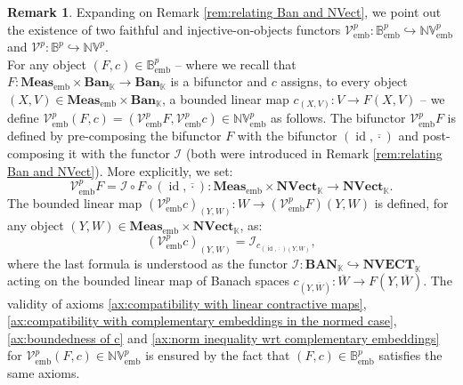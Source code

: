 \documentclass{amsart}
\theoremstyle{definition}
\newtheorem{remark}[definition]{Remark}
\theoremstyle{plain}
\newcommand{\id}{\operatorname{id}}
\newcommand{\embMeas}{\mathbf{Meas}_\mathrm{emb}}
\newcommand{\NVect}{\mathbf{NVect}_{\mathbb{K}}}
\newcommand{\NVECT}{\mathbf{NVECT}_{\mathbb{K}}}
\newcommand{\NVembp}{\mathbb{NV}_{\mathrm{emb}}^p}
\newcommand{\NVp}{\mathbb{NV}^p}
\newcommand{\Ban}{\mathbf{Ban}_{\mathbb{K}}}
\newcommand{\BAN}{\mathbf{BAN}_{\mathbb{K}}}
\newcommand{\Bembp}{\mathbb{B}_{\mathrm{emb}}^p}
\newcommand{\Bp}{\mathbb{B}^p}
\begin{document}
        \begin{remark}
        \label{rem:on all the forgetful functors}
            Expanding on Remark \ref{rem:relating Ban and NVect}, we point out the existence of two faithful and injective-on-objects functors $\mathcal{V}_{\mathrm{emb}}^p \colon \Bembp \hookrightarrow \NVembp$ and $\mathcal{V}^p \colon \Bp \hookrightarrow \NVp$. \\
            For any object $(F,c) \in \Bembp$ -- where we recall that $F \colon \embMeas \times \Ban \rightarrow \Ban$ is a bifunctor and $c$ assigns, to every object $(X,V) \in \embMeas \times \Ban$, a bounded linear map $c_{(X,V)} \colon V \rightarrow F(X,V)$ -- we define $\mathcal{V}_{\mathrm{emb}}^p(F,c) = \left( \mathcal{V}_{\mathrm{emb}}^pF,\mathcal{V}_{\mathrm{emb}}^pc \right) \in \NVembp$ as follows.
            The bifunctor $\mathcal{V}_{\mathrm{emb}}^pF$ is defined by pre-composing the bifunctor $F$ with the bifunctor $(\id,\overline{\cdot})$ and post-composing it with the functor $\mathcal{I}$ (both were introduced in Remark \ref{rem:relating Ban and NVect}). More explicitly, we set:  
            \begin{equation}
            \label{eq:definition of the functor Vembp}
                \mathcal{V}_{\mathrm{emb}}^pF = \mathcal{I} \circ F \circ (\id,\overline{\cdot}) \colon \embMeas \times \NVect \rightarrow \NVect.
            \end{equation}
            The bounded linear map $\left( \mathcal{V}_{\mathrm{emb}}^pc \right)_{(Y,W)} \colon W \rightarrow \left( \mathcal{V}_{\mathrm{emb}}^pF \right)(Y,W)$ is defined, for any object $(Y,W) \in \embMeas \times \NVect$, as: 
            \begin{equation*}
                \left( \mathcal{V}_{\mathrm{emb}}^pc \right)_{(Y,W)} = \mathcal{I}_{c_{(\id,\overline{\cdot})(Y,W)}}, 
            \end{equation*}
            where the last formula is understood as the functor $\mathcal{I} \colon \BAN \hookrightarrow \NVECT$ acting on the bounded linear map of Banach spaces $c_{(Y,\overline{W})} \colon \overline{W} \rightarrow F\left( Y,\overline{W} \right)$.  
            The validity of axioms \ref{ax:compatibility with linear contractive maps}, \ref{ax:compatibility with complementary embeddings in the normed case}, \ref{ax:boundedness of c} and \ref{ax:norm inequality wrt complementary embeddings} for $\mathcal{V}_{\mathrm{emb}}^p(F,c) \in \NVembp$ is ensured by the fact that $(F,c) \in \Bembp$ satisfies the same axioms. \\

\end{remark}
\end{document}
